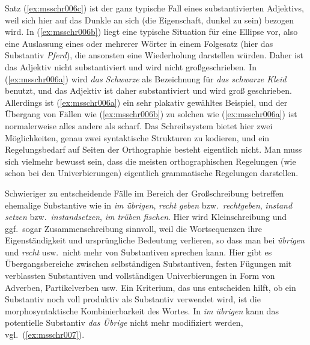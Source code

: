 \begin{exe}
  \ex\label{ex:msschr006} 
  \begin{xlist}
  \end{xlist}
\end{exe}

Satz (\ref{ex:msschr006c}) ist der ganz typische Fall eines substantivierten Adjektivs, weil sich hier auf das Dunkle an sich (die Eigenschaft, dunkel zu sein) bezogen wird.
In (\ref{ex:msschr006b}) liegt eine typische Situation für eine Ellipse vor, also eine Auslassung eines oder mehrerer Wörter in einem Folgesatz (hier das Substantiv \textit{Pferd}), die ansonsten eine Wiederholung darstellen würden.
Daher ist das Adjektiv nicht substantiviert und wird nicht großgeschrieben.
In (\ref{ex:msschr006a}) wird \textit{das Schwarze} als Bezeichnung für \textit{das schwarze Kleid} benutzt, und das Adjektiv ist daher substantiviert und wird groß geschrieben.
Allerdings ist (\ref{ex:msschr006a}) ein sehr plakativ gewähltes Beispiel, und der Übergang von Fällen wie (\ref{ex:msschr006b}) zu solchen wie (\ref{ex:msschr006a}) ist normalerweise alles andere als scharf.
Das Schreibsystem bietet hier zwei Möglichkeiten, genau zwei syntaktische Strukturen zu kodieren, und ein Regelungsbedarf auf Seiten der Orthographie besteht eigentlich nicht.
Man muss sich vielmehr bewusst sein, dass die meisten orthographischen Regelungen (wie schon bei den Univerbierungen) eigentlich grammatische Regelungen darstellen.

Schwieriger zu entscheidende Fälle im Bereich der Großschreibung betreffen ehemalige Substantive wie in \textit{im übrigen}, \textit{recht geben} bzw.\ \textit{rechtgeben}, \textit{instand setzen} bzw.\ \textit{instandsetzen}, \textit{im trüben fischen}.
Hier wird Kleinschreibung und ggf.\ sogar Zusammenschreibung sinnvoll, weil die Wortsequenzen ihre Eigenständigkeit und ursprüngliche Bedeutung verlieren, so dass man bei \textit{übrigen} und \textit{recht} usw.\ nicht mehr von Substantiven sprechen kann.
Hier gibt es Übergangsbereiche zwischen selbständigen Substantiven, festen Fügungen mit verblassten Substantiven und vollständigen Univerbierungen in Form von Adverben, Partikelverben usw.
Ein Kriterium, das uns entscheiden hilft, ob ein Substantiv noch voll produktiv als Substantiv verwendet wird, ist die morphosyntaktische Kombinierbarkeit des Wortes.
In \textit{im übrigen} kann \zB das potentielle Substantiv \textit{das Übrige} \zB nicht mehr modifiziert werden, vgl.\ (\ref{ex:msschr007}).

